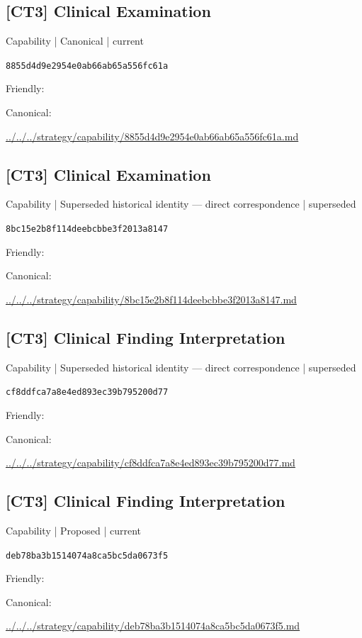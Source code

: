 \documentclass[10pt,a4paper]{article}
\begin{document}
\subsection*{[CT3] Clinical Examination}
{\small Capability | Canonical | current}\par
\texttt{8855d4d9e2954e0ab66ab65a556fc61a}\par
Friendly: \par
Canonical: \par
{\footnotesize\url{../../../strategy/capability/8855d4d9e2954e0ab66ab65a556fc61a.md}}\par
\subsection*{[CT3] Clinical Examination}
{\small Capability | Superseded historical identity — direct correspondence | superseded}\par
\texttt{8bc15e2b8f114deebcbbe3f2013a8147}\par
Friendly: \par
Canonical: \par
{\footnotesize\url{../../../strategy/capability/8bc15e2b8f114deebcbbe3f2013a8147.md}}\par
\subsection*{[CT3] Clinical Finding Interpretation}
{\small Capability | Superseded historical identity — direct correspondence | superseded}\par
\texttt{cf8ddfca7a8e4ed893ec39b795200d77}\par
Friendly: \par
Canonical: \par
{\footnotesize\url{../../../strategy/capability/cf8ddfca7a8e4ed893ec39b795200d77.md}}\par
\subsection*{[CT3] Clinical Finding Interpretation}
{\small Capability | Proposed | current}\par
\texttt{deb78ba3b1514074a8ca5bc5da0673f5}\par
Friendly: \par
Canonical: \par
{\footnotesize\url{../../../strategy/capability/deb78ba3b1514074a8ca5bc5da0673f5.md}}\par
\end{document}
